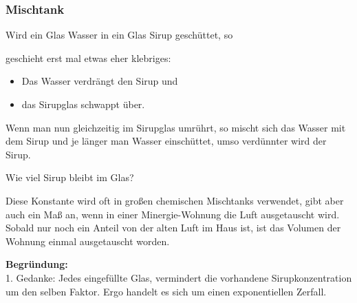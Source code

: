 \subsubsection{Mischtank}\label{sirup_beispiel}
Wird ein Glas Wasser in ein Glas Sirup geschüttet, so


geschieht erst mal etwas eher klebriges:
\begin{itemize}
  \item Das Wasser verdrängt den Sirup und
  \item das Sirupglas schwappt über.
\end{itemize}

Wenn man nun gleichzeitig im Sirupglas
umrührt, so mischt sich das Wasser mit dem Sirup und je länger man
Wasser einschüttet, umso verdünnter wird der Sirup.


Wie viel Sirup bleibt im Glas?


Diese Konstante wird oft in großen chemischen Mischtanks verwendet,
gibt aber auch ein Maß an, wenn \zB in einer Minergie-Wohnung die Luft
ausgetauscht wird. Sobald nur noch ein Anteil von  der alten Luft im
Haus ist, ist das Volumen der Wohnung einmal ausgetauscht worden.
\newpage


\textbf{Begründung:}\\
1. Gedanke: Jedes eingefüllte Glas, vermindert die vorhandene
Sirupkonzentration um den selben Faktor. Ergo handelt es sich um
einen exponentiellen Zerfall.

\leserluft

